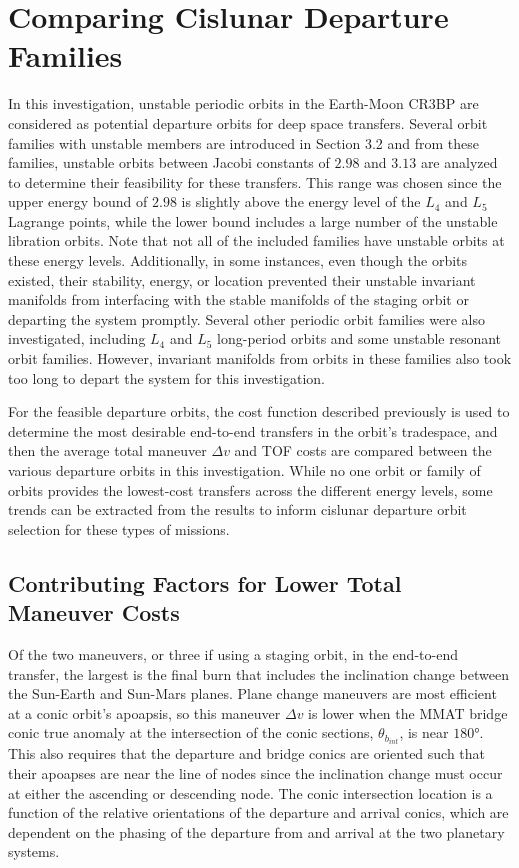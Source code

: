 \section{Comparing Cislunar Departure Families}
In this investigation, unstable periodic orbits in the Earth-Moon CR3BP are considered as potential
departure orbits for deep space transfers. Several orbit families with unstable members are
introduced in Section 3.2 and from these families, unstable orbits between Jacobi constants of
$2.98$ and $3.13$ are analyzed to determine their feasibility for these transfers. This range was
chosen since the upper energy bound of $2.98$ is slightly above the energy level of the $L_{4}$ and
$L_{5}$ Lagrange points, while the lower bound includes a large number of the unstable libration
orbits\cite{Zimovan:2017}. Note that not all of the included families have unstable orbits at these
energy levels. Additionally, in some instances, even though the orbits existed, their stability,
energy, or location prevented their unstable invariant manifolds from interfacing with the stable
manifolds of the staging orbit or departing the system promptly. Several other periodic orbit
families were also investigated, including $L_{4}$ and $L_{5}$ long-period orbits and some unstable
resonant orbit families. However, invariant manifolds from orbits in these families also took too
long to depart the system for this investigation.

For the feasible departure orbits, the cost function described previously is used to determine the
most desirable end-to-end transfers in the orbit's tradespace, and then the average total
maneuver $\Delta v$ and TOF costs are compared between the various departure orbits in this
investigation. While no one orbit or family of orbits provides the lowest-cost transfers across the
different energy levels, some trends can be extracted from the results to inform cislunar departure
orbit selection for these types of missions.

\subsection{Contributing Factors for Lower Total Maneuver Costs}
Of the two maneuvers, or three if using a staging orbit, in the end-to-end transfer, the largest is
the final burn that includes the inclination change between the Sun-Earth and Sun-Mars planes.
Plane change maneuvers are most efficient at a conic orbit's apoapsis, so this maneuver $\Delta v$
is lower when the MMAT bridge conic true anomaly at the intersection of the conic sections,
$\theta_{b_{int}}$, is near $\ang{180}$. This also requires that the departure and bridge conics
are oriented such that their apoapses are near the line of nodes since the inclination change must
occur at either the ascending or descending node. The conic intersection location is a function of
the relative orientations of the departure and arrival conics, which are dependent on the phasing
of the departure from and arrival at the two planetary systems. 

